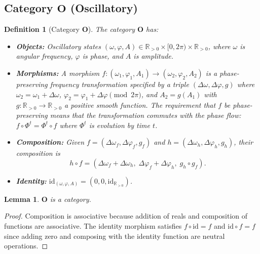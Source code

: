 \documentclass[twocolumn,10pt]{article}
\newtheorem{lemma}[theorem]{Lemma}
\newtheorem{definition}[theorem]{Definition}
\theoremstyle{remark}
\newcommand{\CatO}{\mathbf{O}}
\begin{document}
\subsection{Category $\CatO$ (Oscillatory)}

\begin{definition}[Category $\CatO$]
\label{def:catO}
The category $\CatO$ has:
\begin{itemize}
    \item \textbf{Objects:} Oscillatory states $(\omega, \varphi, A) \in \mathbb{R}_{>0} \times [0,2\pi) \times \mathbb{R}_{>0}$, where $\omega$ is angular frequency, $\varphi$ is phase, and $A$ is amplitude.

    \item \textbf{Morphisms:} A morphism $f: (\omega_1,\varphi_1,A_1) \to (\omega_2,\varphi_2,A_2)$ is a phase-preserving frequency transformation specified by a triple $(\Delta\omega, \Delta\varphi, g)$ where $\omega_2 = \omega_1 + \Delta\omega$, $\varphi_2 = \varphi_1 + \Delta\varphi \pmod{2\pi}$, and $A_2 = g(A_1)$ with $g: \mathbb{R}_{>0} \to \mathbb{R}_{>0}$ a positive smooth function.
    The requirement that $f$ be \emph{phase-preserving} means that the transformation commutes with the phase flow: $f \circ \Phi^t = \Phi^t \circ f$ where $\Phi^t$ is evolution by time $t$.

    \item \textbf{Composition:} Given $f = (\Delta\omega_f, \Delta\varphi_f, g_f)$ and $h = (\Delta\omega_h, \Delta\varphi_h, g_h)$, their composition is
    \begin{equation}
    h \circ f = (\Delta\omega_f + \Delta\omega_h,\; \Delta\varphi_f + \Delta\varphi_h,\; g_h \circ g_f).
    \end{equation}

    \item \textbf{Identity:} $\mathrm{id}_{(\omega,\varphi,A)} = (0, 0, \mathrm{id}_{\mathbb{R}_{>0}})$.
\end{itemize}
\end{definition}

\begin{lemma}
$\CatO$ is a category.
\end{lemma}
\begin{proof}
Composition is associative because addition of reals and composition of functions are associative.
The identity morphism satisfies $f \circ \mathrm{id} = f$ and $\mathrm{id} \circ f = f$ since adding zero and composing with the identity function are neutral operations.
\end{proof}
\end{document}
